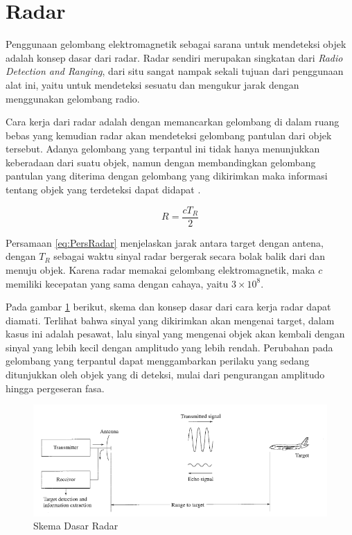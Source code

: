 \section{Radar}

Penggunaan gelombang elektromagnetik sebagai sarana untuk mendeteksi objek adalah konsep dasar dari radar. Radar sendiri merupakan singkatan dari \textit{Radio Detection and Ranging}, dari situ sangat nampak sekali tujuan dari penggunaan alat ini, yaitu untuk mendeteksi sesuatu dan mengukur jarak dengan menggunakan gelombang radio. 

Cara kerja dari radar adalah dengan memancarkan gelombang di dalam ruang bebas yang kemudian radar akan mendeteksi gelombang pantulan dari objek tersebut. Adanya gelombang yang terpantul ini tidak hanya menunjukkan keberadaan dari suatu objek, namun dengan membandingkan gelombang pantulan yang diterima dengan gelombang yang dikirimkan maka informasi tentang objek yang terdeteksi dapat didapat \cite{Skolnik2001}.

\begin{equation}
	R = \frac{cT_{R}}{2}
	\label{eq:PersRadar}
\end{equation}

Persamaan \ref{eq:PersRadar} menjelaskan jarak antara target dengan antena, dengan $T_{R}$ sebagai waktu sinyal radar bergerak secara bolak balik dari dan menuju objek. Karena radar memakai gelombang elektromagnetik, maka $c$ memiliki kecepatan yang sama dengan cahaya, yaitu $3 \times 10 ^{8}$.

Pada gambar \ref{pic:skemaRadar} berikut, skema dan konsep dasar dari cara kerja radar dapat diamati. Terlihat bahwa sinyal yang dikirimkan akan mengenai target, dalam kasus ini adalah pesawat, lalu sinyal yang mengenai objek akan kembali dengan sinyal yang lebih kecil dengan amplitudo yang lebih rendah. Perubahan pada gelombang yang terpantul dapat menggambarkan perilaku yang sedang ditunjukkan oleh objek yang di deteksi, mulai dari pengurangan amplitudo hingga pergeseran fasa.

\begin{figure}
	\begin{center}
		\includegraphics[scale=0.5]{pics/bab2/skemaradar.png} 
		\caption[Skema Dasar Radar]{{Skema Dasar Radar} \cite{Skolnik2001}}
		\label{pic:skemaRadar}
	\end{center}
\end{figure}

